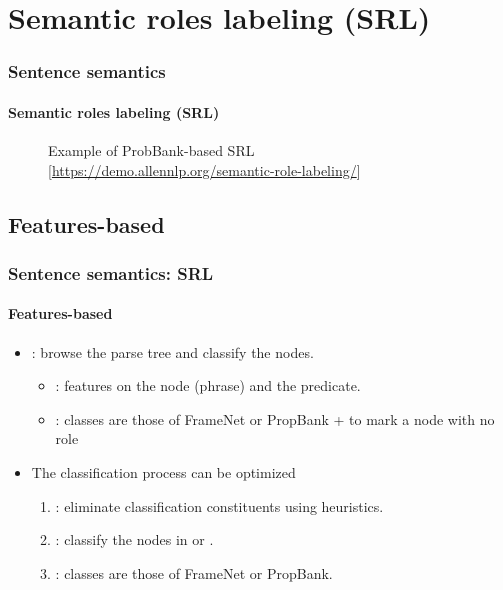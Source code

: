 \documentclass[xcolor=table]{beamer}
\begin{document}
\section{Semantic roles labeling (SRL)}

\begin{frame}
\frametitle{Sentence semantics}
\framesubtitle{Semantic roles labeling (SRL)}

\begin{figure}
	\caption{Example of ProbBank-based SRL [\url{https://demo.allennlp.org/semantic-role-labeling/}]}
\end{figure}
	
\end{frame}

\subsection{Features-based}

\begin{frame}
	\frametitle{Sentence semantics: SRL}
	\framesubtitle{Features-based}
	
	\begin{itemize}
		\item {}: browse the parse tree and classify the nodes.
		\begin{itemize}
			\item {}: features on the node (phrase) and the predicate.
			\item {}: classes are those of FrameNet or PropBank +  to mark a node with no role
		\end{itemize} 
		\item The classification process can be optimized
		\begin{enumerate}
			\item {}: eliminate classification constituents using heuristics.
			\item {}: classify the nodes in  or .
			\item {}: classes are those of FrameNet or PropBank.
		\end{enumerate} 
	\end{itemize}
	
\end{frame}
\end{document}

